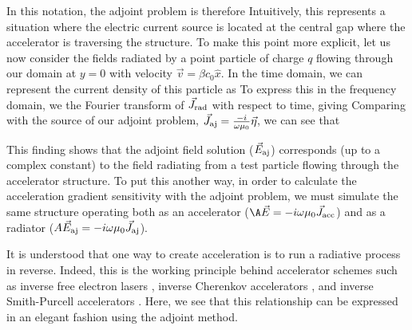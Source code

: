 In this notation, the adjoint problem is therefore
%
%
Intuitively, this represents a situation where the electric current source is located at the central gap where the accelerator is traversing the structure.
To make this point more explicit, let us now consider the fields radiated by a point particle of charge $q$ flowing through our domain at $y = 0$ with velocity $\vec{v} = \beta c_0 \hat{x}$.
In the time domain, we can represent the current density of this particle as
%
%
To express this in the frequency domain, we the Fourier transform of $\vec{J}_\textrm{rad}$ with respect to time, giving
%
%
Comparing with the source of our adjoint problem, $\vec{J}_{\textrm{aj}} = \frac{-i}{\omega\mu_0}\vec{\eta}$, we can see that 
%

This finding shows that the adjoint field solution ($\vec{E}_{\textrm{aj}}$) corresponds (up to a complex constant) to the field radiating from a test particle flowing through the accelerator structure.
To put this another way, in order to calculate the acceleration gradient sensitivity with the adjoint problem, we must simulate the same structure operating both as an accelerator ($\A\vE=-i\omega\mu_0\vJ_\textrm{acc}$) and as a radiator ($A\vec{E}_{\textrm{aj}}=-i\omega\mu_0\vec{J}_{\textrm{aj}}$).

It is understood that one way to create acceleration is to run a radiative process in reverse.
Indeed, this is the working principle behind accelerator schemes such as inverse free electron lasers \cite{musumeci2005high, courant1985high}, inverse Cherenkov accelerators \cite{kimura1995laser, fontana1983high}, and inverse Smith-Purcell accelerators \cite{bae1992experimental, mizuno1987experimental}.
Here, we see that this relationship can be expressed in an elegant fashion using the adjoint method.

